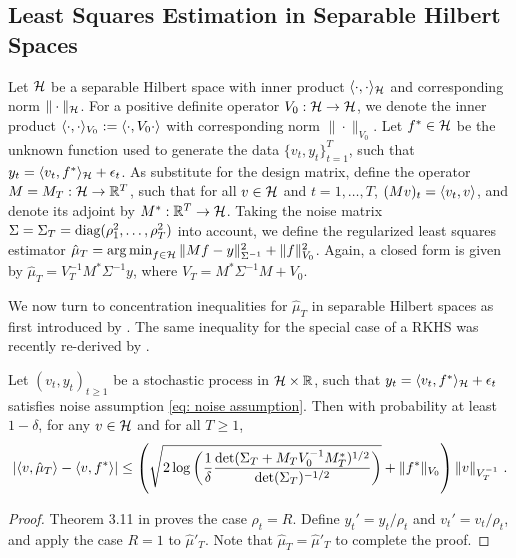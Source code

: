 \subsection{Least Squares Estimation in Separable Hilbert Spaces}
Let $\mathcal{H}$ be a separable Hilbert space with inner product $\langle\cdot,\cdot\rangle_{\mathcal{H}}$ and corresponding norm $\|\cdot\|_{\mathcal{H}}$. For a positive definite operator $V_0 : \mathcal{H} \rightarrow \mathcal{H}$, we denote the inner product $\langle\cdot, \cdot\rangle_{V_0} :=  \langle\cdot, V_0\cdot\rangle$ with corresponding norm $\|\cdot \|_{V_0}$. Let $f^* \in \mathcal{H}$ be the unknown function used to generate the data $\{v_t,y_t\}_{t=1}^T$, such that $y_t = \langle v_t, f^*\rangle_{\mathcal{H}} + \epsilon_t$. As substitute for the design matrix, define the operator $M = M_T : \mathcal{H} \rightarrow \mathbb{R}^T$, such that for all $ v\in \mathcal{H}$ and $t = 1, \dots, T$, $(Mv)_t = \langle v_t, v\rangle$, and denote its adjoint by $M^* : \mathbb{R}^T \rightarrow \mathcal{H}$. Taking the noise matrix $\Sigma = \Sigma_T = \text{diag}(\rho_1^2, \dots, \rho_T^2)$ into account, we define the regularized least squares estimator $\hat{\mu}_T = \operatorname*{arg\,min}_{f \in \mathcal{H}}  \|M f - y\|_{\Sigma^{-1}}^2 + \|f\|_{V_0}^2$. Again, a closed form is given by $\hat{\mu}_T = V_T^{-1}M^*\Sigma^{-1}y$, where $V_T = M^*\Sigma^{-1} M + V_0$.

We now turn to concentration inequalities for $\hat{\mu}_T$ in separable Hilbert spaces as first introduced by \cite{Abbasi-YadkoriOnlinelearninglinearly2012}. The same inequality for the special case of a RKHS was recently re-derived by \cite{ChowdhuryKernelizedMultiarmedBandits2017}.
\begin{lemma}\label{lemma: concentration inequality separaple hilbert spaces}
	Let $(v_t,y_t)_{t\geq 1}$ \linebreak be a stochastic process in $\mathcal{H} \times \mathbb{R}$, such that $y_t = \langle v_t, f^*\rangle_{\mathcal{H}} + \epsilon_t$ satisfies noise assumption \eqref{eq: noise assumption}. Then with probability at least $1-\delta$, for any $v \in \mathcal{H}$ and for all $T \geq 1$,
	\begin{align*}
	|\langle v,\hat{\mu}_T\rangle - \langle v, f^*\rangle| \leq \left( \sqrt{ 2\log\left(\frac{1}{\delta}\frac{\det(\Sigma_T + M_TV_0^{-1}M_T^*)^{1/2}}{ \det(\Sigma_T)^{-1/2}}\right)} + \|f^*\|_{V_0}\right)  \|v\|_{V_T^{-1}} \text{ .}
	\end{align*}
\end{lemma}
\begin{proof}
	Theorem 3.11 in \cite{Abbasi-YadkoriOnlinelearninglinearly2012} proves the case $\rho_t=R$. Define $y_t' = y_t / \rho_t$ and $v_t' = v_t/\rho_t$, and apply the case $R=1$ to $\hat{\mu}'_T$. Note that $\hat{\mu}_T = \hat{\mu}'_T$ to complete the proof.
\end{proof}

